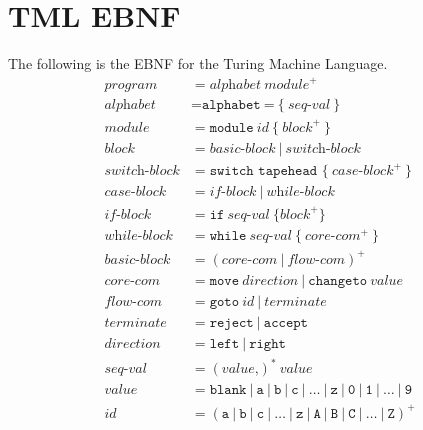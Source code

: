\chapter{TML EBNF}
The following is the EBNF for the Turing Machine Language.
\begin{align*}
    \textit{program} &= \textit{alphabet} \ \textit{module}^+ \\
    \textit{alphabet} &= \texttt{alphabet} \ \texttt{=} \ \texttt{\{} \ \textit{seq-val} \ \texttt{\}} \\
    \textit{module} &= \texttt{module} \ \textit{id} \ \texttt{\{} \ \textit{block}^+ \ \texttt{\}} \\
    \textit{block} &= \textit{basic-block} \ | \ \textit{switch-block} \\
    \textit{switch-block} &= \texttt{switch tapehead \{} \ \textit{case-block}^+ \ \texttt{\}} \\
    \textit{case-block} &= \textit{if-block} \ | \ \textit{while-block} \\
    \textit{if-block} &= \texttt{if} \ \textit{seq-val} \ \texttt{\{} \textit{block}^+ \texttt{\}} \\
    \textit{while-block} &= \texttt{while} \ \textit{seq-val} \ \texttt{\{} \ \textit{core-com}^+ \ \texttt{\}} \\
    \textit{basic-block} &= (\textit{core-com} \ | \ \textit{flow-com})^+ \\
    \textit{core-com} &= \texttt{move} \ \textit{direction} \ | \ \texttt{changeto} \ \textit{value} \\
    \textit{flow-com} &= \texttt{goto} \ \textit{id} \ | \ \textit{terminate} \\
    \textit{terminate} &= \texttt{reject} \ | \ \texttt{accept} \\
    \textit{direction} &= \texttt{left} \ | \ \texttt{right} \\
    \textit{seq-val} &= (\textit{value} \texttt{,})^* \ \textit{value} \\
    \textit{value} &= \texttt{blank} \ | \ \texttt{a} \ | \ \texttt{b} \ | \ \texttt{c} \ | \ \dots \ | \ \texttt{z} \ | \ \texttt{0} \ | \ \texttt{1} \ | \ \dots \ | \ \texttt{9} \\
    \textit{id} &= (\texttt{a} \ | \ \texttt{b} \ | \ \texttt{c} \ | \ \dots \ | \ \texttt{z} \ | \ \texttt{A} \ | \ \texttt{B} \ | \ \texttt{C} \ | \ \dots \ | \ \texttt{Z})^+
\end{align*}